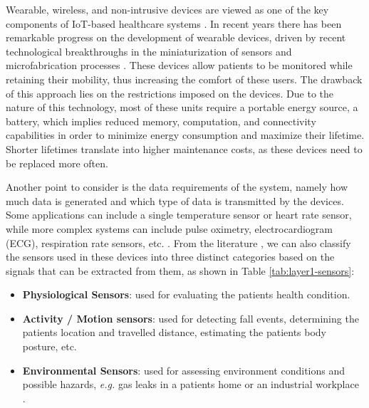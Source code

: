 Wearable, wireless, and non-intrusive devices are viewed as one of the key components of \acs{IoT}-based healthcare systems \cite{Baker2017}. In recent years there has been remarkable progress on the development of wearable devices, driven by recent technological breakthroughs in the miniaturization of sensors and microfabrication processes \cite{Adame2018, Catarinucci2015}. These devices allow patients to be monitored while retaining their mobility, thus increasing the comfort of these users. The drawback of this approach lies on the restrictions imposed on the devices. Due to the nature of this technology, most of these units require a portable energy source, a battery, which implies reduced memory, computation, and connectivity capabilities in order to minimize energy consumption and maximize their lifetime. Shorter lifetimes translate into higher maintenance costs, as these devices need to be replaced more often. \bigskip

Another point to consider is the data requirements of the system, namely how much data is generated and which type of data is transmitted by the devices. Some applications can include a single temperature sensor or heart rate sensor, while more complex systems can include pulse oximetry, electrocardiogram (\acs{ECG}), respiration rate sensors, etc. \cite{Wu2020}. From the literature \cite{Wu2020, Wu2019, Adame2018, MinhDang2019}, we can also classify the sensors used in these devices into three distinct categories based on the signals that can be extracted from them, as shown in Table \ref{tab:layer1-sensors}:

\begin{itemize}
    \item \textbf{Physiological Sensors}: used for evaluating the patients health condition.
    \item \textbf{Activity / Motion sensors}: used for detecting fall events, determining the patients location and travelled distance, estimating the patients body posture, etc.
    \item \textbf{Environmental Sensors}: used for assessing environment conditions and possible hazards, \textit{e.g.} gas leaks in a patients home or an industrial workplace \cite{Wu2019}.
\end{itemize}

